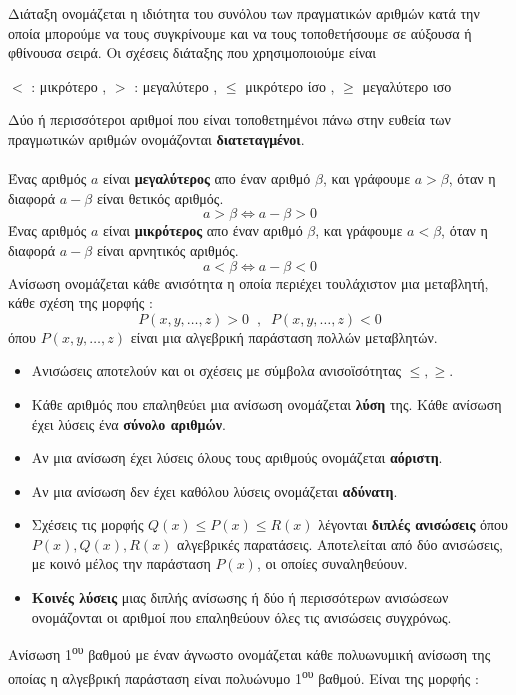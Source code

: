 \documentclass[twoside,nofonts,internet,shmeiwseis]{thewria}
\begin{document}
\orismoi
{}
Διάταξη ονομάζεται η ιδιότητα του συνόλου των πραγματικών αριθμών κατά την οποία μπορούμε να τους συγκρίνουμε και να τους τοποθετήσουμε σε αύξουσα ή φθίνουσα σειρά. Οι σχέσεις διάταξης που χρησιμοποιούμε είναι
\begin{center}
$ < $ : μικρότερο  \;,\;  $ > $ : μεγαλύτερο  \;,\; $ \leq $  μικρότερο ίσο \;,\; $ \geq $  μεγαλύτερο ισο  
\end{center}
Δύο ή περισσότεροι αριθμοί που είναι τοποθετημένοι πάνω στην ευθεία των πραγμωτικών αριθμών ονομάζονται \textbf{διατεταγμένοι}.\mbox{}\\\\
Ένας αριθμός $ a $ είναι \textbf{μεγαλύτερος} απο έναν αριθμό $ \beta $, και γράφουμε $a>\beta$, όταν η διαφορά $ a-\beta$ είναι θετικός αριθμός.
\[ a>\beta\Leftrightarrow a-\beta>0 \]
Ένας αριθμός $ a $ είναι \textbf{μικρότερος} απο έναν αριθμό $ \beta $, και γράφουμε $a<\beta$, όταν η διαφορά $a-\beta$ είναι αρνητικός αριθμός.
\[ a<\beta\Leftrightarrow a-\beta<0 \]
Ανίσωση ονομάζεται κάθε ανισότητα η οποία περιέχει τουλάχιστον μια μεταβλητή, κάθε σχέση της μορφής :
\[ P(x,y,\ldots,z)>0\;\;,\;\;P(x,y,\ldots,z)<0 \]
όπου $ P(x,y,\ldots,z) $ είναι μια αλγεβρική παράσταση πολλών μεταβλητών.
\begin{itemize}[itemsep=0mm]
\item Ανισώσεις αποτελούν και οι σχέσεις με σύμβολα ανισοϊσότητας $ \leq,\geq $.
\item Κάθε αριθμός που επαληθεύει μια ανίσωση ονομάζεται \textbf{λύση} της. Κάθε ανίσωση έχει λύσεις ένα \textbf{σύνολο αριθμών}.
\item Αν μια ανίσωση έχει λύσεις όλους τους αριθμούς ονομάζεται \textbf{αόριστη}.
\item Αν μια ανίσωση δεν έχει καθόλου λύσεις ονομάζεται \textbf{αδύνατη}.
\item Σχέσεις τις μορφής $ Q(x)\leq P(x)\leq R(x) $ λέγονται \textbf{διπλές ανισώσεις} όπου $ P(x),Q(x),R(x) $ αλγεβρικές παρατάσεις. Αποτελείται από δύο ανισώσεις, με κοινό μέλος την παράσταση $ P(x) $, οι οποίες συναληθεύουν.
\item \textbf{Κοινές λύσεις} μιας διπλής ανίσωσης ή δύο ή περισσότερων ανισώσεων ονομάζονται οι αριθμοί που επαληθεύουν όλες τις ανισώσεις συγχρόνως.
\end{itemize}
Ανίσωση 1\textsuperscript{ου} βαθμού με έναν άγνωστο ονομάζεται κάθε πολυωνυμική ανίσωση της οποίας η αλγεβρική παράσταση είναι πολυώνυμο 1\textsuperscript{ου} βαθμού. Είναι της μορφής :
\end{document}
